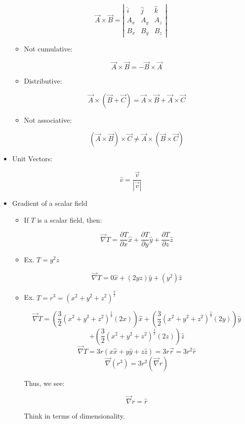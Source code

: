 \begin{itemize}
    $$\vec{A}\times\vec{B}=\left|\begin{matrix}\hat{i} & \hat{j} & \hat{k}\\ A_x & A_y & A_z\\ B_x & B_y & B_z\end{matrix}\right|$$

    \begin{itemize}

      \item Not cumulative:

    $$\vec{A}\times\vec{B}=-\vec{B}\times\vec{A}$$

      \item Distributive:

        $$\vec{A}\times(\vec{B}+\vec{C})=\vec{A}\times\vec{B}+\vec{A}\times\vec{C}$$

      \item Not associative:

        $$(\vec{A}\times\vec{B})\times\vec{C}\neq\vec{A}\times(\vec{B}\times\vec{C})$$

    \end{itemize}

  \item Unit Vectors:

    $$\hat{v}=\frac{\vec{v}}{|\vec{v}|}$$

  \item Gradient of a scalar field

    \begin{itemize}

      \item If $T$ is a scalar field, then:

        $$\vec{\nabla}T=\frac{\partial T}{\partial x}\hat{x}+\frac{\partial T}{\partial y}\hat{y}+\frac{\partial T}{\partial z}\hat{z}$$

      \item Ex. $T=y^2z$

        $$\vec{\nabla}T=0\hat{x}+(2yz)\hat{y}+(y^2)\hat{z}$$

      \item Ex. $T=r^3=(x^2+y^2+z^2)^{\frac{3}{2}}$

        $$\vec{\nabla}T=\left(\frac{3}{2}(x^2+y^2+z^2)^{\frac{1}{2}}(2x)\right)\hat{x}+\left(\frac{3}{2}(x^2+y^2+z^2)^{\frac{1}{2}}(2y)\right)\hat{y}$$
        $$+\left(\frac{3}{2}(x^2+y^2+z^2)^{\frac{1}{2}}(2z)\right)\hat{z}$$
        $$\vec{\nabla}T=3r(x\hat{x}+y\hat{y}+z\hat{z})=3r\vec{r}=3r^2\hat{r}$$
        $$\vec{\nabla}(r^3)=3r^2(\vec{\nabla}r)$$

        Thus, we see:

        $$\vec{\nabla}r=\hat{r}$$

        Think in terms of dimensionality.

    \end{itemize}

\end{itemize}



